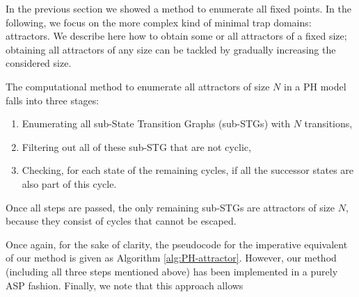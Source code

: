 
In the previous section we showed a method to enumerate all fixed points.
In the following, we focus on the more complex kind of minimal trap domains: attractors.
We describe here how to obtain some or all attractors of a fixed size;
obtaining all attractors of any size
can be tackled by gradually increasing the considered size.

The computational method to enumerate all attractors of size $N$ in a PH model falls into three stages:
\begin{enumerate}
  \item Enumerating all sub-State Transition Graphs (sub-STGs)
    with $N$ transitions,
  \item Filtering out all of these sub-STG that are not cyclic,
  \item Checking, for each state of the remaining cycles,
    if all the successor states are also part of this cycle.
\end{enumerate}
Once all steps are passed, the only remaining sub-STGs are attractors of size $N$,
because they consist of cycles that cannot be escaped.

Once again, for the sake of clarity,
the pseudocode for the imperative equivalent of our method is given as Algorithm \ref{alg:PH-attractor}.
However, our method (including all three steps mentioned above) has been implemented in a purely ASP fashion.
Finally, we note that this approach allows 

